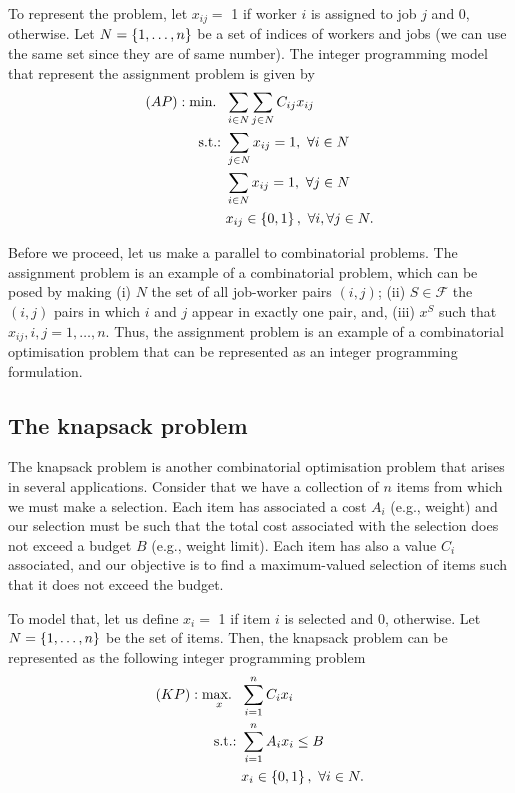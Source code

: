 To represent the problem, let $x_{ij} =$ 1 if worker $i$ is assigned to job $j$ and 0, otherwise. Let $N = \left\{ 1,\dots,n \right \}$ be a set of indices of workers and jobs (we can use the same set since they are of same number). The integer programming model that represent the assignment problem is given by
%  
\begin{align*} 
  (AP) : \mathop{\text{min.~}} \ & \sum_{i \in N}\sum_{j \in N} C_{ij}x_{ij} \\
  \mathop{\text{s.t.:~}} & \sum_{j \in N} x_{ij} = 1, \ \forall i \in N\\
      & \sum_{i \in N} x_{ij} = 1, \ \forall j \in N\\
      & x_{ij} \in \left\{ 0,1 \right \},  \ \forall i, \forall j \in N.
\end{align*}
%

Before we proceed, let us make a parallel to combinatorial problems. The assignment problem is an example of a combinatorial problem, which can be posed by making (i) $N$ the set of all job-worker pairs $(i,j)$; (ii) $S \in \mathcal{F}$ the $(i,j)$ pairs in which $i$ and $j$ appear in exactly one pair, and, (iii) $x^S$ such that $x_{ij}, i,j = 1,\dots,n$. Thus, the assignment problem is an example of a combinatorial optimisation problem that can be represented as an integer programming formulation.


\subsection{The knapsack problem}

The knapsack problem is another combinatorial optimisation problem that arises in several applications. Consider that we have a collection of $n$ items from which we must make a selection. Each item has associated a cost $A_i$ (e.g., weight) and our selection must be such that the total cost associated with the selection does not exceed a budget $B$ (e.g., weight limit). Each item has also a value $C_i$ associated, and our objective is to find a maximum-valued selection of items such that it does not exceed the budget. 

To model that, let us define $x_{i} =$ 1 if item $i$ is selected and 0, otherwise. Let $N = \left\{ 1,\dots,n \right \}$ be the set of items. Then, the knapsack problem can be represented as the following integer programming problem     
%  
\begin{align*}
	(KP) : \mathop{\text{max.~}}_x \ & \sum_{i=1}^nC_{i}x_{i} \\
	\mathop{\text{s.t.:~}} & \sum_{i = 1}^n A_{i}x_{i} \leq B\\
	  & x_{i} \in \left\{ 0,1 \right \}, \ \forall i \in N. 
\end{align*}

